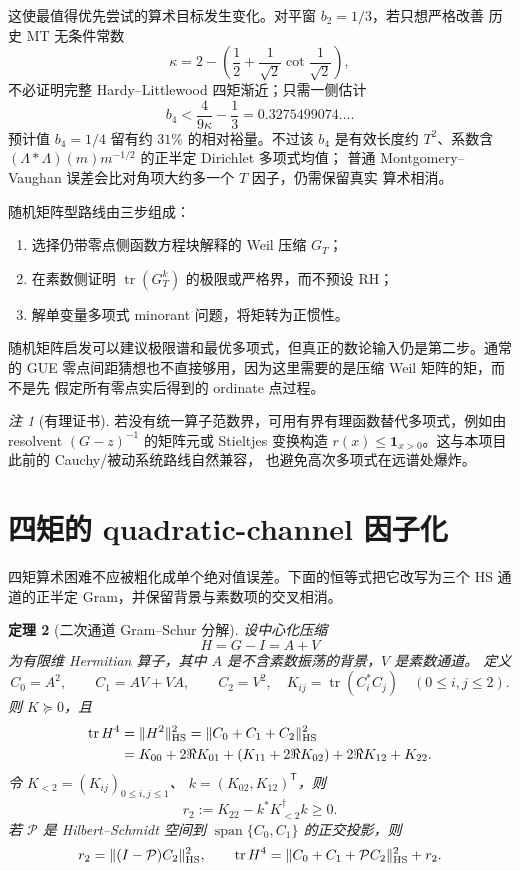 \documentclass[UTF8,11pt,a4paper]{ctexart}
\newtheorem{theorem}{定理}[section]
\theoremstyle{definition}
\theoremstyle{remark}
\newtheorem{remark}[theorem]{注}
\newcommand{\tr}{\operatorname{tr}}
\begin{document}
这使最值得优先尝试的算术目标发生变化。对平窗 $b_2=1/3$，若只想严格改善
历史 MT 无条件常数
\[
 \kappa=2-\left(\frac12+\frac1{\sqrt2}\cot\frac1{\sqrt2}\right),
\]
不必证明完整 Hardy--Littlewood 四矩渐近；只需一侧估计
\[
 b_4<\frac4{9\kappa}-\frac13
 =0.3275499074\ldots.
\]
预计值 $b_4=1/4$ 留有约 $31\%$ 的相对裕量。不过该 $b_4$ 是有效长度约
$T^2$、系数含 $(\Lambda*\Lambda)(m)m^{-1/2}$ 的正半定 Dirichlet 多项式均值；
普通 Montgomery--Vaughan 误差会比对角项大约多一个 $T$ 因子，仍需保留真实
算术相消。

随机矩阵型路线由三步组成：
\begin{enumerate}
\item 选择仍带零点侧函数方程块解释的 Weil 压缩 $G_T$；
\item 在素数侧证明 $\tr(G_T^k)$ 的极限或严格界，而不预设 RH；
\item 解单变量多项式 minorant 问题，将矩转为正惯性。
\end{enumerate}
随机矩阵启发可以建议极限谱和最优多项式，但真正的数论输入仍是第二步。通常的
GUE 零点间距猜想也不直接够用，因为这里需要的是压缩 Weil 矩阵的矩，而不是先
假定所有零点实后得到的 ordinate 点过程。

\begin{remark}[有理证书]
若没有统一算子范数界，可用有界有理函数替代多项式，例如由 resolvent
$(G-z)^{-1}$ 的矩阵元或 Stieltjes 变换构造
$r(x)\le\mathbf1_{x>0}$。这与本项目此前的 Cauchy/被动系统路线自然兼容，
也避免高次多项式在远谱处爆炸。
\end{remark}

\section{四矩的 quadratic-channel 因子化}

四矩算术困难不应被粗化成单个绝对值误差。下面的恒等式把它改写为三个
HS 通道的正半定 Gram，并保留背景与素数项的交叉相消。

\begin{theorem}[二次通道 Gram--Schur 分解]\label{thm:quadratic-channel}
设中心化压缩
\[
 H=G-I=A+V
\]
为有限维 Hermitian 算子，其中 $A$ 是不含素数振荡的背景，$V$ 是素数通道。
定义
\[
 C_0=A^2,\qquad C_1=AV+VA,\qquad C_2=V^2,
\quad
 K_{ij}=\tr(C_i^*C_j)\quad(0\le i,j\le2).
\]
则 $K\succeq0$，且
\begin{align}
 \tr H^4
 &=\|H^2\|_{\rm HS}^2
 =\|C_0+C_1+C_2\|_{\rm HS}^2 \notag\\
 &=K_{00}+2\Re K_{01}
   +(K_{11}+2\Re K_{02})+2\Re K_{12}+K_{22}.
 \label{eq:quadratic-channel-ledger}
\end{align}
令 $K_{<2}=(K_{ij})_{0\le i,j\le1}$、
$k=(K_{02},K_{12})^{\mathsf T}$，则
\[
 r_2:=K_{22}-k^*K_{<2}^{\dagger}k\ge0.
\]
若 $\mathcal P$ 是 Hilbert--Schmidt 空间到
$\operatorname{span}\{C_0,C_1\}$ 的正交投影，则
\[
 r_2=\|(I-\mathcal P)C_2\|_{\rm HS}^2,\qquad
 \tr H^4=\|C_0+C_1+\mathcal PC_2\|_{\rm HS}^2+r_2.
\]
\end{theorem}
\end{document}
